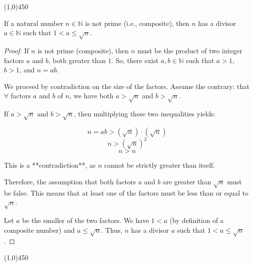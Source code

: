     \begin{center}
        \vspace{10pt}
        \line(1,0){450}
        \vspace{25pt}
    \end{center}

\begin{proposition}
    If a natural number $n \in \mathbb{N}$ is not prime (i.e., composite), then $n$ has a divisor $a \in \mathbb{N}$ such that $1 < a \le \sqrt{n}$.
\end{proposition}

\begin{proof}
    If $n$ is not prime (composite), then $n$ must be the product of two integer factors $a$ and $b$, both greater than $1$. So, there exist $a, b \in \mathbb{N}$ such that $a > 1$, $b > 1$, and $n = ab$.
    
    We proceed by contradiction on the size of the factors. Assume the contrary: that $\forall$ factors $a$ and $b$ of $n$, we have both $a > \sqrt{n}$ and $b > \sqrt{n}$.
    
    If $a > \sqrt{n}$ and $b > \sqrt{n}$, then multiplying these two inequalities yields:
    
    $$n = ab > (\sqrt{n}) \cdot (\sqrt{n})$$
    $$n > (\sqrt{n})^2$$
    $$n > n$$
    
    This is a **contradiction**, as $n$ cannot be strictly greater than itself.
    
    Therefore, the assumption that both factors $a$ and $b$ are greater than $\sqrt{n}$ must be false. This means that at least one of the factors must be less than or equal to $\sqrt{n}$.
    
    Let $a$ be the smaller of the two factors. We have $1 < a$ (by definition of a composite number) and $a \le \sqrt{n}$. Thus, $n$ has a divisor $a$ such that $1 < a \le \sqrt{n}$.
\end{proof}

    \begin{center}
        \vspace{10pt}
        \line(1,0){450}
        \vspace{25pt}
    \end{center}


